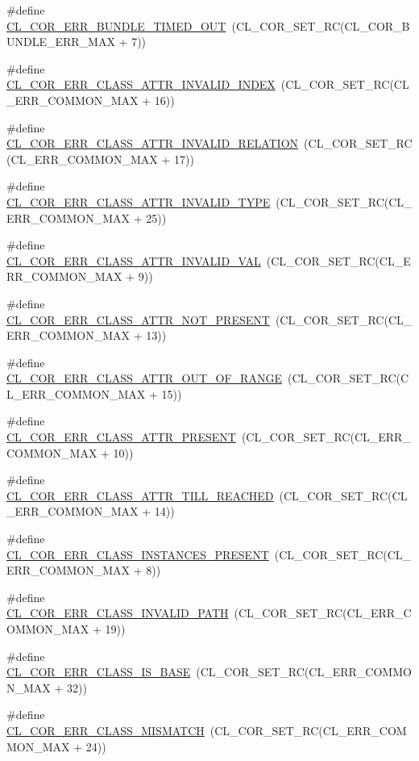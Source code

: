 \begin{CompactItemize}
\item 
\#define \hyperlink{group__group13_ga253}{CL\_\-COR\_\-ERR\_\-BUNDLE\_\-TIMED\_\-OUT}~(CL\_\-COR\_\-SET\_\-RC(CL\_\-COR\_\-BUNDLE\_\-ERR\_\-MAX + 7))
\item 
\#define \hyperlink{group__group13_ga171}{CL\_\-COR\_\-ERR\_\-CLASS\_\-ATTR\_\-INVALID\_\-INDEX}~(CL\_\-COR\_\-SET\_\-RC(CL\_\-ERR\_\-COMMON\_\-MAX + 16))
\item 
\#define \hyperlink{group__group13_ga172}{CL\_\-COR\_\-ERR\_\-CLASS\_\-ATTR\_\-INVALID\_\-RELATION}~(CL\_\-COR\_\-SET\_\-RC(CL\_\-ERR\_\-COMMON\_\-MAX + 17))
\item 
\#define \hyperlink{group__group13_ga180}{CL\_\-COR\_\-ERR\_\-CLASS\_\-ATTR\_\-INVALID\_\-TYPE}~(CL\_\-COR\_\-SET\_\-RC(CL\_\-ERR\_\-COMMON\_\-MAX + 25))
\item 
\#define \hyperlink{group__group13_ga164}{CL\_\-COR\_\-ERR\_\-CLASS\_\-ATTR\_\-INVALID\_\-VAL}~(CL\_\-COR\_\-SET\_\-RC(CL\_\-ERR\_\-COMMON\_\-MAX + 9))
\item 
\#define \hyperlink{group__group13_ga168}{CL\_\-COR\_\-ERR\_\-CLASS\_\-ATTR\_\-NOT\_\-PRESENT}~(CL\_\-COR\_\-SET\_\-RC(CL\_\-ERR\_\-COMMON\_\-MAX + 13))
\item 
\#define \hyperlink{group__group13_ga170}{CL\_\-COR\_\-ERR\_\-CLASS\_\-ATTR\_\-OUT\_\-OF\_\-RANGE}~(CL\_\-COR\_\-SET\_\-RC(CL\_\-ERR\_\-COMMON\_\-MAX + 15))
\item 
\#define \hyperlink{group__group13_ga165}{CL\_\-COR\_\-ERR\_\-CLASS\_\-ATTR\_\-PRESENT}~(CL\_\-COR\_\-SET\_\-RC(CL\_\-ERR\_\-COMMON\_\-MAX + 10))
\item 
\#define \hyperlink{group__group13_ga169}{CL\_\-COR\_\-ERR\_\-CLASS\_\-ATTR\_\-TILL\_\-REACHED}~(CL\_\-COR\_\-SET\_\-RC(CL\_\-ERR\_\-COMMON\_\-MAX + 14))
\item 
\#define \hyperlink{group__group13_ga163}{CL\_\-COR\_\-ERR\_\-CLASS\_\-INSTANCES\_\-PRESENT}~(CL\_\-COR\_\-SET\_\-RC(CL\_\-ERR\_\-COMMON\_\-MAX + 8))
\item 
\#define \hyperlink{group__group13_ga174}{CL\_\-COR\_\-ERR\_\-CLASS\_\-INVALID\_\-PATH}~(CL\_\-COR\_\-SET\_\-RC(CL\_\-ERR\_\-COMMON\_\-MAX + 19))
\item 
\#define \hyperlink{group__group13_ga187}{CL\_\-COR\_\-ERR\_\-CLASS\_\-IS\_\-BASE}~(CL\_\-COR\_\-SET\_\-RC(CL\_\-ERR\_\-COMMON\_\-MAX + 32))
\item 
\#define \hyperlink{group__group13_ga179}{CL\_\-COR\_\-ERR\_\-CLASS\_\-MISMATCH}~(CL\_\-COR\_\-SET\_\-RC(CL\_\-ERR\_\-COMMON\_\-MAX + 24))
\item 

\end{CompactItemize}
